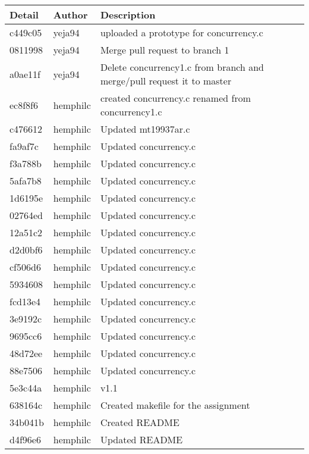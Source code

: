 \documentclass[onecolumn, draftclsnofoot,10pt, compsoc]{IEEEtran}
\begin{document}
\begin{tabular}{l l l}

\textbf{Detail} & \textbf{Author} & \textbf{Description}\\
\hline {c449c05} & yeja94 & uploaded a  prototype for concurrency.c  \\
\hline {0811998} & yeja94 & Merge pull request to branch 1  \\
\hline {a0ae11f} & yeja94 & Delete concurrency1.c from branch and merge/pull request it to master \\
\hline {ec8f8f6} & {hemphilc} & {created concurrency.c renamed from concurrency1.c} \\
\hline {c476612} & {hemphilc} & {Updated mt19937ar.c} \\
\hline {fa9af7c} & {hemphilc} & {Updated concurrency.c} \\
\hline {f3a788b} & {hemphilc} & {Updated concurrency.c} \\
\hline {5afa7b8} & {hemphilc} & {Updated concurrency.c} \\
\hline {1d6195e} & {hemphilc} & {Updated concurrency.c} \\
\hline {02764ed} & {hemphilc} & {Updated concurrency.c} \\
\hline {12a51c2} & {hemphilc} & {Updated concurrency.c} \\
\hline {d2d0bf6} & {hemphilc} & {Updated concurrency.c} \\
\hline {cf506d6} & {hemphilc} & {Updated concurrency.c} \\
\hline {5934608} & {hemphilc} & {Updated concurrency.c} \\
\hline {fcd13e4} & {hemphilc} & {Updated concurrency.c} \\
\hline {3e9192c} & {hemphilc} & {Updated concurrency.c} \\
\hline {9695cc6} & {hemphilc} & {Updated concurrency.c} \\
\hline {48d72ee} & {hemphilc} & {Updated concurrency.c} \\
\hline {88e7506} & {hemphilc} & {Updated concurrency.c} \\
\hline {5e3c44a} & {hemphilc} & {v1.1} \\
\hline {638164c} & {hemphilc} & {Created makefile for the assignment} \\
\hline {34b041b} & {hemphilc} & {Created README} \\
\hline {d4f96e6} & {hemphilc} & {Updated README} \\

\end{tabular}
\end{document}
